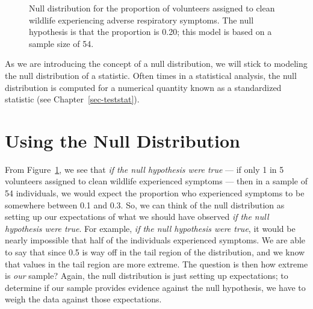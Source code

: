 \documentclass[
  letterpaper,
  DIV=11,
  numbers=noendperiod]{scrreprt}
\theoremstyle{plain}
\theoremstyle{definition}
\theoremstyle{definition}
\theoremstyle{remark}
\begin{document}
\begin{figure}


\caption{\label{fig-nulldistns-deepwater-null}Null distribution for the
proportion of volunteers assigned to clean wildlife experiencing adverse
respiratory symptoms. The null hypothesis is that the proportion is
0.20; this model is based on a sample size of 54.}

\end{figure}%

As we are introducing the concept of a null distribution, we will stick
to modeling the null distribution of a statistic. Often times in a
statistical analysis, the null distribution is computed for a numerical
quantity known as a standardized statistic (see
Chapter~\ref{sec-teststat}).

\section{Using the Null Distribution}\label{using-the-null-distribution}

From Figure~\ref{fig-nulldistns-deepwater-null}, we see that \emph{if
the null hypothesis were true} --- if only 1 in 5 volunteers assigned to
clean wildlife experienced symptoms --- then in a sample of 54
individuals, we would expect the proportion who experienced symptoms to
be somewhere between 0.1 and 0.3. So, we can think of the null
distribution as setting up our expectations of what we should have
observed \emph{if the null hypothesis were true}. For example, \emph{if
the null hypothesis were true}, it would be nearly impossible that half
of the individuals experienced symptoms. We are able to say that since
0.5 is way off in the tail region of the distribution, and we know that
values in the tail region are more extreme. The question is then how
extreme is \emph{our} sample? Again, the null distribution is just
setting up expectations; to determine if our sample provides evidence
against the null hypothesis, we have to weigh the data against those
expectations.
\end{document}
